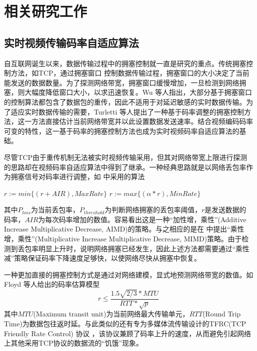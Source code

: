 \chapter{相关研究工作}
\label{chap:related}

\section{实时视频传输码率自适应算法}
自互联网诞生以来，数据传输过程中的拥塞控制就一直是研究的重点。传统拥塞控制方法，如TCP，通过拥塞窗口 \cite{jacobson1988congestion} 控制数据传输过程，拥塞窗口的大小决定了当前能发送的数据数量。为了探测网络带宽，拥塞窗口缓慢增加，一旦检测到网络拥塞，则大幅度降低窗口大小，以求迅速恢复。Wu \cite{wu2000end}等人指出，大部分基于拥塞窗口的控制算法都包含了数据包的重传，因此不适用于对延迟敏感的实时数据传输。为了适应实时数据传输的需要，Turletti \cite{turletti1996videoconferencing} 等人提出了一种基于码率调整的拥塞控制方法，这一方法直接估计当前网络带宽并以此设置数据发送速率。结合视频编码码率可变的特性，这一基于码率的拥塞控制方法也成为实时视频码率自适应算法的基础。

尽管TCP由于重传机制无法被实时视频传输采用，但其对网络带宽上限进行探测的思路却在视频码率自适应算法中得到了继承。一种经典思路就是以网络丢包率作为拥塞信号对码率进行调整，如 \cite{wu2000end} 中采用的算法
\begin{algorithmic}
    \State $r := min\{(r+AIR), MaxRate \} $
\Else
    \State $r := max\{(\alpha * r), MinRate \} $
\EndIf
\end{algorithmic}
其中$P_{loss}$为当前丢包率，$P_{threshold}$为判断网络拥塞的丢包率阈值，$r$是发送数据的码率，$AIR$为每次码率增加的数值。容易看出这是一种``加性增，乘性''(Additive Increase Multiplicative Decrease, AIMD)的策略。与之相应的是在 \cite{turletti1996videoconferencing} 中提出``乘性增，乘性''(Multiplicative Increase Multiplicative Decrease, MIMD)策略。由于检测到丢包率明显上升时，说明网络拥塞已经发生，因此上述方法都需要通过``乘性减''策略保证码率下降速度足够快，以使网络尽快从拥塞中恢复。

一种更加直接的拥塞控制方式是通过对网络建模，显式地预测网络带宽的数值。如Floyd \cite{floyd1999promoting} 等人给出的码率估算模型
\begin{equation}
  r \le \frac{1.5\sqrt{2/3} * MTU}{RTT * \sqrt{p}}
\end{equation}
其中$MTU$(Maximum transit unit)为当前网络最大传输单元，$RTT$(Round Trip Time)为数据包往返时延。与此类似的还有专为多媒体流传输设计的TFRC(TCP Friendly Rate Control) 协议 \cite{handley2003tcp}，该协议兼顾了码率上升的速度，从而避免引起网络上其他采用TCP协议的数据流的``饥饿''现象。


